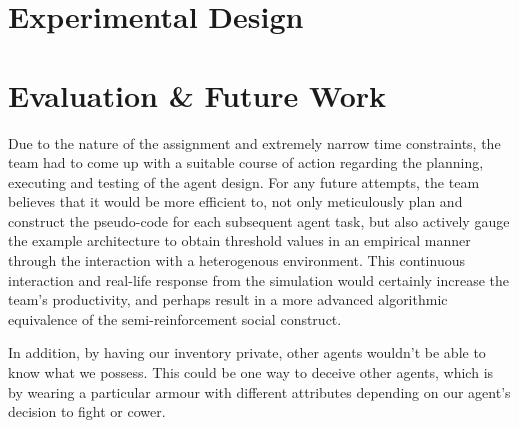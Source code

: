 


\section{Experimental Design}



\section{Evaluation \& Future Work}

Due to the nature of the assignment and extremely narrow time constraints, the team had to come up with a suitable course of action regarding the planning, executing and testing of the agent design. For any future attempts, the team believes that it would be more efficient to, not only meticulously plan and construct the pseudo-code for each subsequent agent task, but also actively gauge the example architecture to obtain threshold values in an empirical manner through the interaction with a heterogenous environment. This continuous interaction and real-life response from the simulation would certainly increase the team's productivity, and perhaps result in a more advanced algorithmic equivalence of the semi-reinforcement social construct.

In addition, by having our inventory private, other agents wouldn't be able to know what we possess. This could be one way to deceive other agents, which is by wearing a particular armour with different attributes depending on our agent's decision to fight or cower. 